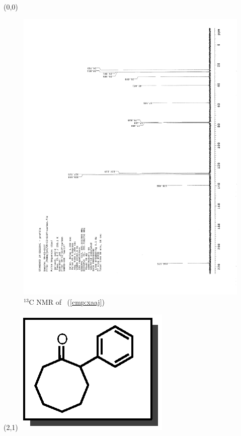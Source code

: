 \clearpage
\begin{textblock}{20}(0,0)
\begin{figure}[htb]
\caption{$^{13}$C NMR of  \CMPxaaj\ (\ref{cmp:xaaj})}
\includegraphics[scale=0.75, trim = 0mm 0mm 0mm 5mm,
clip]{chp_asymmetric/images/nmr/xaajC}
\vspace{-100pt}
\end{figure}
\end{textblock}
\begin{textblock}{1}(2,1)
\includegraphics[scale=0.8, angle=90]{chp_asymmetric/images/xaaj}
\end{textblock}
\clearpage

